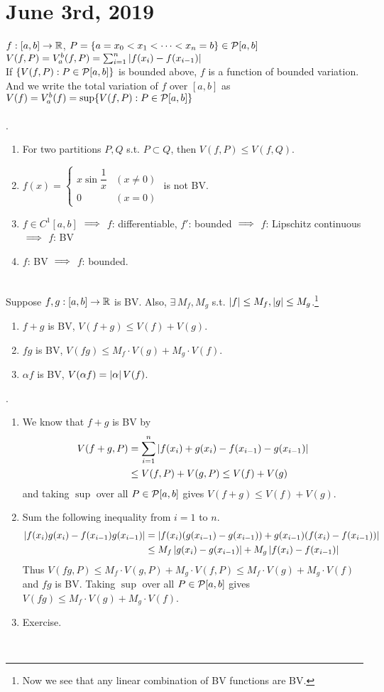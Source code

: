 \section*{June 3rd, 2019}
$f:[a, b]\rightarrow\mathbb{R}$, $P = \{a=x_0 < x_1 < \cdots < x_n=b\}\in\mathcal{P}[a, b]$\\
$V(f, P) = V_a^b(f, P) = \sum_{i=1}^{n} \left|f(x_i)-f(x_{i-1})\right|$\\
If $\{V(f, P): P\in \mathcal{P}[a, b] \}$ is bounded above, $f$ is a function of bounded variation. And we write the total variation of $f$ over $[a, b]$ as $V(f) = V_a^b (f) = \sup \{V(f, P): P\in \mathcal{P}[a, b] \}$\\
\\
\rmk.
\begin{enumerate}
	\item For two partitions $P, Q$ s.t. $P\subset Q$, then $V(f, P) \leq V(f, Q)$.
	\item $f(x) = \begin{cases}
		x\sin \dfrac{1}{x} &(x\neq 0) \\ 0  &(x = 0)
	\end{cases}$ is not BV.
	\item $f\in C^1[a, b]$ $\implies$ $f$: differentiable, $f'$: bounded $\implies$ $f$: Lipschitz continuous $\implies$ $f$: BV
	\item $f$: BV $\implies$ $f$: bounded.
\end{enumerate}~\\
 Suppose $f, g:[a, b]\rightarrow\mathbb{R}$ is BV. Also, $\exists\, M_f, M_g$ s.t. $\left|f\right| \leq M_f, \left|g\right|\leq M_g$.\footnote{Now we see that any linear combination of BV functions are BV.}
\begin{enumerate}
	\item $f+g$ is BV, $V(f+g) \leq V(f) + V(g)$.
	\item $fg$ is BV, $V(fg) \leq M_f \cdot V(g) + M_g\cdot V(f)$.
	\item $\alpha f$ is BV, $V(\alpha f) = \left|\alpha\right|V(f)$.
\end{enumerate}
\pf.
\begin{enumerate}
	\item We know that $f+g$ is BV by $$\begin{aligned}
	V(f + g, P) &= \sum_{i=1}^n \left|f(x_i) + g(x_i) - f(x_{i-1}) - g(x_{i-1})\right| \\&\leq V(f, P) + V(g, P)
	\leq V(f) + V(g)
	\end{aligned}$$
	and taking $\sup$ over all $P\in\mathcal{P}[a, b]$ gives $V(f+g)\leq V(f)+V(g)$.
	\item Sum the following inequality from $i=1$ to $n$.
	$$\begin{aligned}
		\left|f(x_i)g(x_i) - f(x_{i-1})g(x_{i-1})\right| &= \left|f(x_i)(g(x_{i-1})-g(x_{i-1})) + g(x_{i-1})(f(x_{i}) - f(x_{i-1}))\right| \\&\leq M_f \left|g(x_i) - g(x_{i-1})\right| + M_g \left|f(x_i)-f(x_{i-1})\right|
	\end{aligned}
	$$
	Thus $V(fg, P)\leq M_f \cdot V(g, P) + M_g \cdot V(f, P) \leq M_f \cdot V(g) + M_g \cdot V(f)$ and $fg$ is BV. Taking $\sup$ over all $P\in\mathcal{P}[a, b]$ gives $V(fg)\leq M_f \cdot V(g) + M_g \cdot V(f)$.
	\item Exercise.
\end{enumerate}~\\
